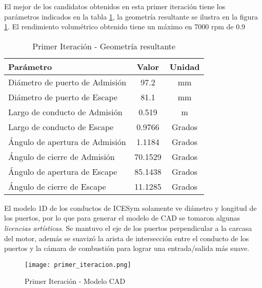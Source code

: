 El mejor de los candidatos obtenidos en esta primer iteración tiene los
parámetros indicados en la tabla \ref{tab:primer_it}, la geometría resultante se
ilustra en la figura \ref{fig:primer_it}.
%
El rendimiento volumétrico obtenido tiene un máximo en 7000 rpm de 0.9

\begin{table}
    \centering
    \begin{tabular}{lcc}
      \toprule
      Parámetro & Valor & Unidad\\
      \midrule
      Diámetro de puerto de Admisión & 97.2    & mm\\
      Diámetro de puerto de Escape   & 81.1    & mm \\
      Largo de conducto de Admisión  & 0.519   & m\\
      Largo de conducto de Escape    & 0.9766  & Grados\\
      Ángulo de apertura de Admisión & 1.1184  & Grados\\
      Ángulo de cierre de Admisión   & 70.1529 & Grados\\
      Ángulo de apertura de Escape   & 85.1438 & Grados\\
      Ángulo de cierre de Escape     & 11.1285 & Grados\\ \bottomrule
    \end{tabular}
    \caption{Primer Iteración - Geometría resultante}
    \label{tab:primer_it}
\end{table}

El modelo 1D de los conductos de ICESym solamente ve diámetro y longitud  de los
puertos, por lo que para generar el modelo de CAD se tomaron algunas
\emph{licencias artísticas}.
%
Se mantuvo el eje de los puertos perpendicular a la carcasa del motor, además se
suavizó la arista de intersección entre el conducto de los puertos y la cámara
de combustión para lograr una entrada/salida más suave.

\begin{figure}
  \centering
  \texttt{[image: primer\_iteracion.png]}
  \caption{Primer Iteración - Modelo CAD}
  \label{fig:primer_it}
\end{figure}
